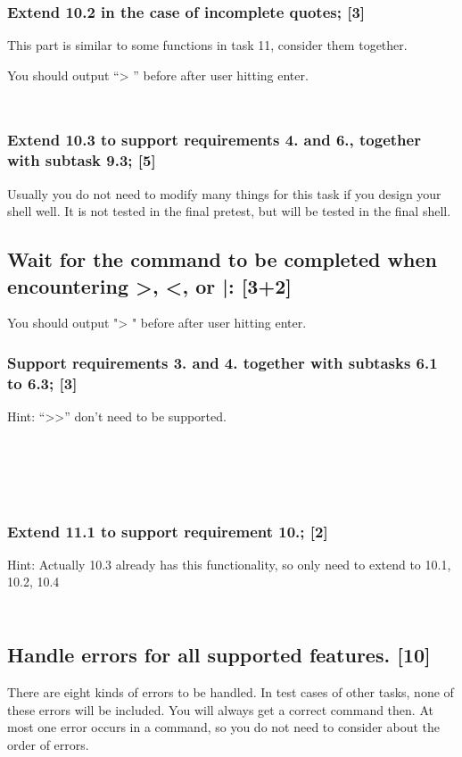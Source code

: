 \documentclass[11pt,a4paper]{article}
\newcommand{\example}[2]{
\begin{tcolorbox}[colback=blue!5!white,colframe=blue!75!black,title=Example (#1)]
\begin{minipage}{0.48\linewidth}
\inputminted{shell}{#2.in}
\end{minipage}
\begin{minipage}{0.48\linewidth}
\inputminted{shell}{#2.out}
\end{minipage}
\end{tcolorbox}
}
\begin{document}
\subsubsection{Extend 10.2 in the case of incomplete quotes; [3]}
This part is similar to some functions in task 11, consider them together. \smallskip

You should output ``> '' before after user hitting enter. \smallskip
\example{Final Pretest Case 6}{../test/final_pretest/case6}

\subsubsection{Extend 10.3 to support requirements 4. and 6., together with subtask 9.3; [5]}
Usually you do not need to modify many things for this task if you design your shell well. It is not tested in the final pretest, but will be tested in the final shell.

\subsection{Wait for the command to be completed when encountering >, <, or |: [3+2]}

You should output "> " before after user hitting enter.
\subsubsection{Support requirements 3. and 4. together with subtasks 6.1 to 6.3; [3]}

Hint: ``>>'' don't need to be supported. \smallskip
\example{Final Pretest Case 7}{../test/final_pretest/case7}
\example{Final Pretest Case 9}{../test/final_pretest/case9}
\example{Final Pretest Case 11}{../test/final_pretest/case11}

\subsubsection{Extend 11.1 to support requirement 10.; [2]}
Hint: Actually 10.3 already has this functionality, so only need to extend to 10.1, 10.2, 10.4 \smallskip
\example{Final Pretest Case 13}{../test/final_pretest/case13}

\subsection{Handle errors for all supported features. [10]}
There are eight kinds of errors to be handled. In test cases of other tasks, none of these errors will be included. You will always get a correct command then. At most one error occurs in a command, so you do not need to consider about the order of errors. \smallskip
\end{document}
